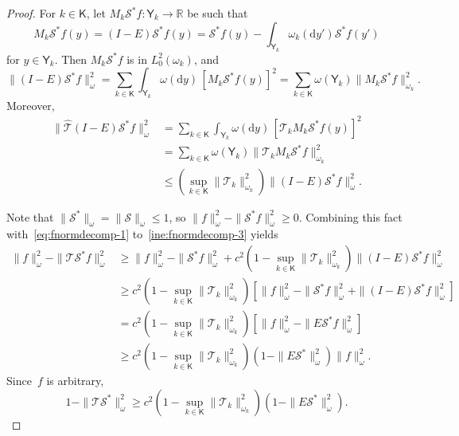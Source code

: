 \documentclass[12pt]{article}
\newcommand{\df}{\mathrm{d}}
\newcommand{\Y}{\mathsf{Y}}
\newcommand{\Mtk}{\mtkfont{T}}
\newcommand{\mtkfont}{\mathcal}
\begin{document}
\begin{proof}
	
	For $k \in \mathsf{K}$, let $M_k \mtkfont{S}^* f: \Y_k \to \mathbb{R}$ be such that
	\[
	M_k \mtkfont{S}^* f (y) = (I-E) \mtkfont{S}^* f(y) = \mtkfont{S}^* f(y) - \int_{\Y_k} \omega_k(\df y') \mtkfont{S}^* f(y')
	\]
	for $y \in \Y_k$.
	Then $M_k\mtkfont{S}^* f$ is in $L_0^2(\omega_k)$, and
	\[
	\|(I - E) \mtkfont{S}^* f \|_{\omega}^2 = \sum_{k \in \mathsf{K}} \int_{\Y_k} \omega(\df y) \, [M_k \mtkfont{S}^* f(y)]^2 = \sum_{k \in \mathsf{K}} \omega(\Y_k) \|M_k \mtkfont{S}^* f \|_{\omega_k}^2.
	\]
	Moreover,
	\begin{equation} \label{ine:fnormdecomp-3}
		\begin{aligned}
			\|\hat{\Mtk } (I-E) \mtkfont{S}^* f \|_{\omega}^2 &= \sum_{k \in \mathsf{K}} \int_{\Y_k} \omega(\df y) \, [\Mtk _k M_k \mtkfont{S}^* f(y)]^2 \\
			&= \sum_{k \in \mathsf{K}} \omega(\Y_k) \|\Mtk _k M_k \mtkfont{S}^* f \|_{\omega_k}^2 \\
			&\leq \left( \sup_{k \in \mathsf{K}} \|\Mtk _k\|_{\omega_k}^2 \right) \|(I - E) \mtkfont{S}^* f \|_{\omega}^2 .
		\end{aligned}
	\end{equation}
	
	Note that $\|\mtkfont{S}^*\|_{\omega} = \|\mtkfont{S} \|_{\omega} \leq 1$, so $\|f\|_{\omega}^2 - \|\mtkfont{S}^*f\|_{\omega}^2 \geq 0$.
	Combining this fact with~\eqref{eq:fnormdecomp-1} to~\eqref{ine:fnormdecomp-3} yields
	\[
	\begin{aligned}
		\|f\|_{\omega}^2 - \|\Mtk \mtkfont{S}^* f\|_{\omega}^2 & \geq \|f\|_{\omega}^2 - \|\mtkfont{S}^*f\|_{\omega}^2 + c^2 \left( 1 - \sup_{k \in \mathsf{K}} \|\Mtk _k\|_{\omega_k}^2 \right) \|(I - E) \mtkfont{S}^* f \|_{\omega}^2 \\
		& \geq c^2 \left( 1 - \sup_{k \in \mathsf{K}} \|\Mtk _k\|_{\omega_k}^2 \right) \left[ \|f\|_{\omega}^2 - \|\mtkfont{S}^*f\|_{\omega}^2 + \|(I - E) \mtkfont{S}^* f \|_{\omega}^2  \right] \\
		&= c^2 \left( 1 - \sup_{k \in \mathsf{K}} \|\Mtk _k\|_{\omega_k}^2 \right) \left[ \|f\|_{\omega}^2 - \|E \mtkfont{S}^*f\|_{\omega}^2  \right] \\
		&\geq c^2 \left( 1 - \sup_{k \in \mathsf{K}} \|\Mtk _k\|_{\omega_k}^2 \right) (1 - \|E\mtkfont{S}^*\|_{\omega}^2) \|f\|_{\omega}^2.
	\end{aligned}
	\]
	Since~$f$ is arbitrary,
	\[
	1 - \|\Mtk \mtkfont{S}^*\|_{\omega}^2 \geq c^2 \left( 1 - \sup_{k \in \mathsf{K}} \|\Mtk _k\|_{\omega_k}^2 \right) (1 - \|E\mtkfont{S}^*\|_{\omega}^2).
	\]
	

\end{proof}
\end{document}

